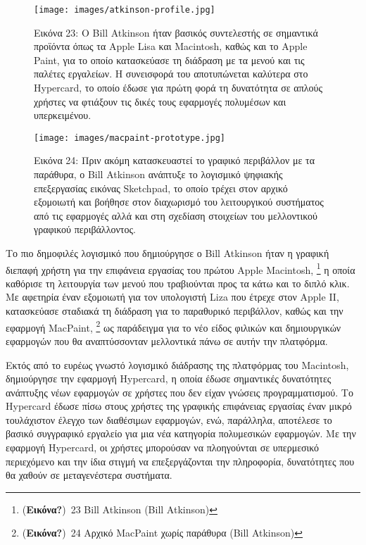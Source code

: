 \documentclass[
]{article}
\begin{document}
\leavevmode{}%
\begin{figure}
\hypertarget{fig:atkinson-profile}{%
\centering
\texttt{[image: images/atkinson-profile.jpg]}
\caption{Εικόνα 23: Ο Bill Atkinson ήταν βασικός συντελεστής σε
σημαντικά προϊόντα όπως τα Apple Lisa και Macintosh, καθώς και το Apple
Paint, για το οποίο κατασκεύασε τη διάδραση με τα μενού και τις παλέτες
εργαλείων. Η συνεισφορά του αποτυπώνεται καλύτερα στο Hypercard, το
οποίο έδωσε για πρώτη φορά τη δυνατότητα σε απλούς χρήστες να φτιάξουν
τις δικές τους εφαρμογές πολυμέσων και
υπερκειμένου.}\label{fig:atkinson-profile}
}
\end{figure}

\leavevmode{}%
\begin{figure}
\hypertarget{fig:macpaint-prototype}{%
\centering
\texttt{[image: images/macpaint-prototype.jpg]}
\caption{Εικόνα 24: Πριν ακόμη κατασκευαστεί το γραφικό περιβάλλον με τα
παράθυρα, ο Bill Atkinson ανάπτυξε το λογισμικό ψηφιακής επεξεργασίας
εικόνας Sketchpad, το οποίο τρέχει στον αρχικό εξομοιωτή και βοήθησε
στον διαχωρισμό του λειτουργικού συστήματος από τις εφαρμογές αλλά και
στη σχεδίαση στοιχείων του μελλοντικού γραφικού
περιβάλλοντος.}\label{fig:macpaint-prototype}
}
\end{figure}

Το πιο δημοφιλές λογισμικό που δημιούργησε ο Bill Atkinson ήταν η
γραφική διεπαφή χρήστη για την επιφάνεια εργασίας του πρώτου Apple
Macintosh, \footnote{(\textbf{Εικόνα?})~23 Bill Atkinson (Bill Atkinson)}
η οποία καθόρισε τη λειτουργία των μενού που τραβιούνται προς τα κάτω
και το διπλό κλικ. Με αφετηρία έναν εξομοιωτή για τον υπολογιστή Liza
που έτρεχε στον Apple II, κατασκεύασε σταδιακά τη διάδραση για το
παραθυρικό περιβάλλον, καθώς και την εφαρμογή MacPaint, \footnote{(\textbf{Εικόνα?})~24
  Αρχικό MacPaint χωρίς παράθυρα (Bill Atkinson)} ως παράδειγμα για το
νέο είδος φιλικών και δημιουργικών εφαρμογών που θα αναπτύσσονταν
μελλοντικά πάνω σε αυτήν την πλατφόρμα.

Εκτός από το ευρέως γνωστό λογισμικό διάδρασης της πλατφόρμας του
Macintosh, δημιούργησε την εφαρμογή Hypercard, η οποία έδωσε σημαντικές
δυνατότητες ανάπτυξης νέων εφαρμογών σε χρήστες που δεν είχαν γνώσεις
προγραμματισμού. Το Hypercard έδωσε πίσω στους χρήστες της γραφικής
επιφάνειας εργασίας έναν μικρό τουλάχιστον έλεγχο των διαθέσιμων
εφαρμογών, ενώ, παράλληλα, αποτέλεσε το βασικό συγγραφικό εργαλείο για
μια νέα κατηγορία πολυμεσικών εφαρμογών. Με την εφαρμογή Hypercard, οι
χρήστες μπορούσαν να πλοηγούνται σε υπερμεσικό περιεχόμενο και την ίδια
στιγμή να επεξεργάζονται την πληροφορία, δυνατότητες που θα χαθούν σε
μεταγενέστερα συστήματα.
\end{document}
